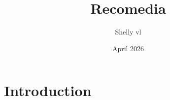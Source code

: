 \documentclass{article}
\title{Recomedia}
\author{Shelly vl}
\date{April 2026}
\begin{document}
\maketitle

\section{Introduction}
\end{document}
